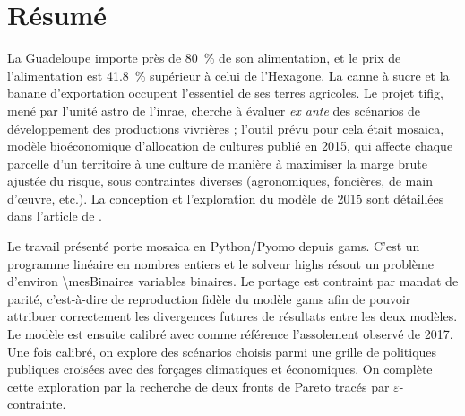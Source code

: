 \chapter*{Résumé}


La Guadeloupe importe près de \SI{80}{\percent} de son alimentation, et le prix de l'alimentation
est \SI{41.8}{\percent} supérieur à celui de l'Hexagone. La canne à sucre et la banane
d'exportation occupent l'essentiel de ses terres agricoles. Le projet \gls{tifig}, mené par l'unité \gls{astro} de
l'\gls{inrae}, cherche à évaluer \emph{ex ante} des scénarios de développement des productions
vivrières ; l'outil prévu pour cela était \gls{mosaica}, modèle bioéconomique d'allocation de
cultures publié en 2015, qui affecte chaque parcelle d'un territoire à une culture de manière à
maximiser la marge brute ajustée du risque, sous contraintes diverses (agronomiques, foncières, de main
d'\oe uvre, etc.). La conception et l'exploration du modèle de 2015 sont détaillées dans
l'article de \textcite{chopin2015}.

Le travail présenté porte \gls{mosaica} en Python/Pyomo depuis \gls{gams}. C'est un programme
linéaire en nombres entiers et le solveur \gls{highs} résout un problème d'environ
\num{\mesBinaires} variables binaires. Le portage est contraint par mandat de parité,
c'est-à-dire de reproduction fidèle du modèle \gls{gams} afin de pouvoir attribuer correctement
les divergences futures de résultats entre les deux modèles.
Le modèle est ensuite calibré avec comme référence l'assolement observé de 2017. Une fois
calibré, on explore des scénarios choisis parmi une grille de politiques publiques croisées avec
des forçages climatiques et économiques. On complète cette exploration par la recherche de
deux fronts de Pareto tracés par $\varepsilon$-contrainte.


